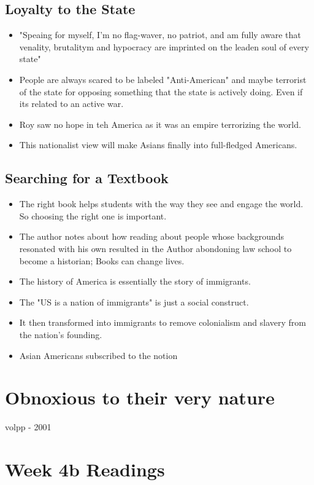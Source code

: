 \documentclass{article}
\begin{document}
\subsection{Loyalty to the State}
\begin{itemize}
  \item "Speaing for myself, I'm no flag-waver, no patriot, and am fully 
    aware that venality, brutalitym and hypocracy are imprinted on the leaden soul of every state"
  \item People are always scared to be labeled "Anti-American" and maybe terrorist of the
    state for opposing something that the state is actively doing.
    Even if its related to an active war.
  \item Roy saw no hope in teh America as it was an empire terrorizing the world.
  \item This nationalist view will make Asians finally into 
    full-fledged Americans.
\end{itemize}

\subsection{Searching for a Textbook}
\begin{itemize}
  \item The right book helps students with the way they see and engage the world.
    So choosing the right one is important.
  \item The author notes about how reading about people whose
    backgrounds resonated with his own resulted in the Author
    abondoning law school to become a historian; Books can change lives.
  \item The history of America is essentially the story of immigrants.
  \item The "US is a nation of immigrants" is just a social construct.
  \item It then transformed into immigrants to remove colonialism and slavery from the
    nation's founding.
  \item Asian Americans subscribed to the notion 
\end{itemize}


\section{Obnoxious to their very nature}
volpp - 2001

\section{Week 4b Readings}
\end{document}
